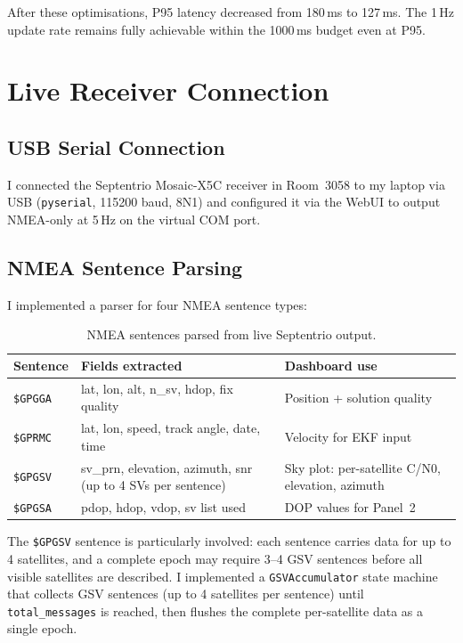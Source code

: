 \documentclass[12pt,a4paper]{article}
\newcommand{\code}[1]{\texttt{#1}}
\begin{document}
After these optimisations, P95 latency decreased from 180\,ms to 127\,ms.
The 1\,Hz update rate remains fully achievable within the 1000\,ms budget even at P95.

\section{Live Receiver Connection}

\subsection{USB Serial Connection}

I connected the Septentrio Mosaic-X5C receiver in Room~3058 to my laptop via USB
(\code{pyserial}, 115200 baud, 8N1) and configured it via the WebUI to output NMEA-only
at 5\,Hz on the virtual COM port.

\subsection{NMEA Sentence Parsing}

I implemented a parser for four NMEA sentence types:

\begin{table}[H]
  \centering
  \caption{NMEA sentences parsed from live Septentrio output.}
  \begin{tabular}{llp{5cm}}
    \toprule
    \textbf{Sentence} & \textbf{Fields extracted} & \textbf{Dashboard use} \\
    \midrule
    \code{\$GPGGA} & lat, lon, alt, n\_sv, hdop, fix quality &
      Position + solution quality \\
    \code{\$GPRMC} & lat, lon, speed, track angle, date, time &
      Velocity for EKF input \\
    \code{\$GPGSV} & sv\_prn, elevation, azimuth, snr (up to 4 SVs per sentence) &
      Sky plot: per-satellite C/N0, elevation, azimuth \\
    \code{\$GPGSA} & pdop, hdop, vdop, sv list used &
      DOP values for Panel~2 \\
    \bottomrule
  \end{tabular}
\end{table}

The \code{\$GPGSV} sentence is particularly involved: each sentence carries data for
up to 4 satellites, and a complete epoch may require 3--4 GSV sentences before all
visible satellites are described.
I implemented a \code{GSVAccumulator} state machine that collects GSV sentences (up to
4 satellites per sentence) until \code{total\_messages} is reached, then flushes the
complete per-satellite data as a single epoch.
\end{document}
